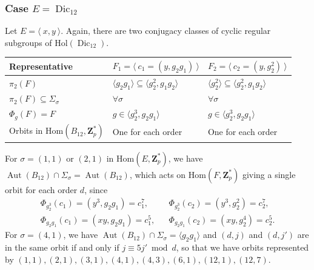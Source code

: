 \documentclass[12pt]{article}
\theoremstyle{definition}
\newcommand{\Z}{\mathbf Z}
\newcommand{\Hol}{\mathrm{Hol}}
\newcommand{\Hom}{\mathrm{Hom}}
\newcommand{\Aut}{\operatorname{Aut}}
\newcommand{\Dic}{\operatorname{Dic}}
\begin{document}
	
	\subsubsection*{Case $E=\Dic_{12}$}
	
	Let $E=\langle \  x,y\ \rangle$. Again, 
	there are two conjugacy classes of cyclic regular subgroups of $\Hol(\Dic_{12})$.

\begin{center}
    \begin{tabular}{|l|l|l|}
    \hline
      Representative& $F_1=\langle\  c_1=(y, g_2g_1) \ \rangle$ & $F_2=\langle\  c_2=(y,g_2^2) \ \rangle$ \\
      \hline
      $\pi_2(F)$ & $\langle g_2g_1\rangle\subseteq \langle g_2^2, g_1g_2\rangle$ &$\langle g_2^2\rangle\subseteq \langle g_2^2, g_1g_2\rangle$\\
      $\pi_2(F)\subseteq \Sigma_{\sigma}$ & $\forall \sigma$ &
      $\forall \sigma$ \\
      $\Phi_g(F)=F$ &$g\in\langle g_2^3,g_2g_1\rangle$ &$g\in\langle g_2^3,g_2g_1\rangle$\\
      Orbits in $\Hom(B_{12},\Z_p^*)$ & One for each order & One for each order \\
      \hline
    \end{tabular}
\end{center}    

    
For $\sigma=(1,1)$ or $(2,1)$ in $\Hom(E,\Z_p^*)$, we have
$\Aut(B_{12})\cap \Sigma_{\sigma}=\Aut(B_{12})$, which acts on
$\Hom(F,\Z_p^*)$ giving a single orbit for each order $d$,
since
	$$
	\begin{array}{lcl}
	\Phi_{g_2^3}(c_1)=(y^3,g_2g_1)=c_1^7,&& \Phi_{g_2^3}(c_2)=(y^3,g_2^2)=c_2^7,\\
	\Phi_{g_2g_1}(c_1)=(xy,g_2g_1)=c_1^5, &&\Phi_{g_2g_1}(c_2)=(xy, g_2^4)=c_2^5.
\end{array}
$$
For $\sigma=(4,1)$, we have
$\Aut(B_{12})\cap \Sigma_{\sigma}=\langle g_2g_1\rangle$ 
and $(d,j)$ and $(d,j')$ are in the same orbit if and only if $j\equiv 5j'\bmod d$, so that we have orbits represented by
$
(1,1),(2,1),(3,1),(4,1),(4,3),(6,1),(12,1),(12,7).
$
\end{document}
